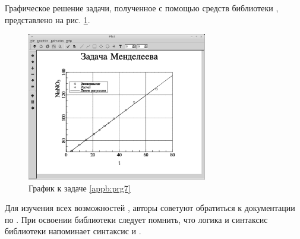 Графическое решение задачи, полученное с помощью средств библиотеки , представлено на рис. \ref{appb:refDrawing9}.

\begin{figure}[htb]
\begin{center}
\includegraphics[width=0.7\textwidth]{img/ris_appb_11}
\caption{График к задаче \ref{appb:prg7}}
\label{appb:refDrawing9}
\end{center}
\end{figure}

Для изучения всех возможностей , авторы советуют обратиться к документации по . 
При освоении библиотеки  следует помнить, что логика и синтаксис библиотеки напоминает 
синтаксис  и  .

